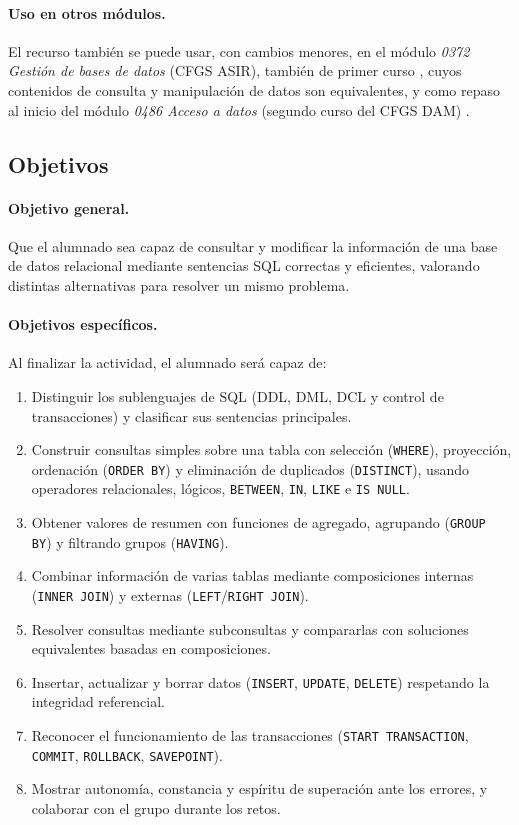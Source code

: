 \documentclass[11pt,a4paper]{article}
\begin{document}
\paragraph{Uso en otros módulos.} El recurso también se puede usar, con cambios menores, en
el módulo \emph{0372 Gestión de bases de datos} (CFGS ASIR), también de primer curso
\cite{rd1629,rd500,ordenASIR}\cite[anexo XLIII]{murcia2026}, cuyos contenidos de consulta y
manipulación de datos son equivalentes, y como repaso al inicio del módulo
\emph{0486 Acceso a datos} (segundo curso del CFGS DAM) \cite{rd405}\cite[anexo XLIV]{murcia2026}.

\subsection{Objetivos}

\paragraph{Objetivo general.} Que el alumnado sea capaz de consultar y modificar la
información de una base de datos relacional mediante sentencias SQL correctas y eficientes,
valorando distintas alternativas para resolver un mismo problema.

\paragraph{Objetivos específicos.} Al finalizar la actividad, el alumnado será capaz de:
\begin{enumerate}[label=\textbf{O\arabic*.}]
  \item Distinguir los sublenguajes de SQL (DDL, DML, DCL y control de transacciones) y
        clasificar sus sentencias principales.
  \item Construir consultas simples sobre una tabla con selección (\texttt{WHERE}),
        proyección, ordenación (\texttt{ORDER BY}) y eliminación de duplicados
        (\texttt{DISTINCT}), usando operadores relacionales, lógicos, \texttt{BETWEEN},
        \texttt{IN}, \texttt{LIKE} e \texttt{IS NULL}.
  \item Obtener valores de resumen con funciones de agregado, agrupando
        (\texttt{GROUP BY}) y filtrando grupos (\texttt{HAVING}).
  \item Combinar información de varias tablas mediante composiciones internas
        (\texttt{INNER JOIN}) y externas (\texttt{LEFT}/\texttt{RIGHT JOIN}).
  \item Resolver consultas mediante subconsultas y compararlas con soluciones equivalentes
        basadas en composiciones.
  \item Insertar, actualizar y borrar datos (\texttt{INSERT}, \texttt{UPDATE},
        \texttt{DELETE}) respetando la integridad referencial.
  \item Reconocer el funcionamiento de las transacciones (\texttt{START TRANSACTION},
        \texttt{COMMIT}, \texttt{ROLLBACK}, \texttt{SAVEPOINT}).
  \item Mostrar autonomía, constancia y espíritu de superación ante los errores,
        y colaborar con el grupo durante los retos.
\end{enumerate}
\end{document}
